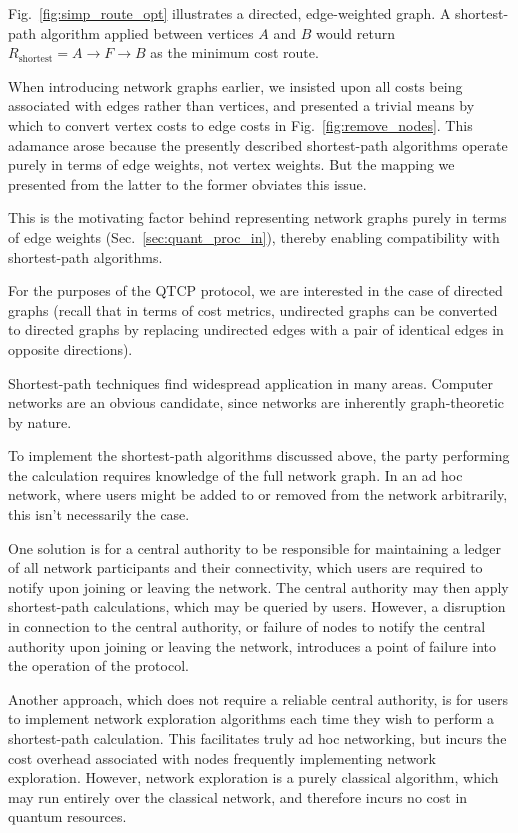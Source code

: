 Fig.~\ref{fig:simp_route_opt} illustrates a directed, edge-weighted graph. A shortest-path algorithm applied between vertices $A$ and $B$ would return \mbox{$R_\mathrm{shortest} = A\to F\to B$} as the minimum cost route.

When introducing network graphs earlier, we insisted upon all costs being associated with edges rather than vertices, and presented a trivial means by which to convert vertex costs to edge costs in Fig.~\ref{fig:remove_nodes}. This adamance arose because the presently described shortest-path algorithms operate purely in terms of edge weights, not vertex weights. But the mapping we presented from the latter to the former obviates this issue.

This is the motivating factor behind representing network graphs purely in terms of edge weights (Sec.~\ref{sec:quant_proc_in}), thereby enabling compatibility with shortest-path algorithms.

For the purposes of the QTCP protocol, we are interested in the case of directed graphs (recall that in terms of cost metrics, undirected graphs can be converted to directed graphs by replacing undirected edges with a pair of identical edges in opposite directions).

Shortest-path techniques find widespread application in many areas. Computer networks are an obvious candidate, since networks are inherently graph-theoretic by nature.

To implement the shortest-path algorithms discussed above, the party performing the calculation requires knowledge of the full network graph. In an ad hoc network, where users might be added to or removed from the network arbitrarily, this isn't necessarily the case.

One solution is for a central authority to be responsible for maintaining a ledger of all network participants and their connectivity, which users are required to notify upon joining or leaving the network. The central authority may then apply shortest-path calculations, which may be queried by users. However, a disruption in connection to the central authority, or failure of nodes to notify the central authority upon joining or leaving the network, introduces a point of failure into the operation of the protocol.

Another approach, which does not require a reliable central authority, is for users to implement network exploration algorithms each time they wish to perform a shortest-path calculation. This facilitates truly ad hoc networking, but incurs the cost overhead associated with nodes frequently implementing network exploration. However, network exploration is a purely classical algorithm, which may run entirely over the classical network, and therefore incurs no cost in quantum resources.

